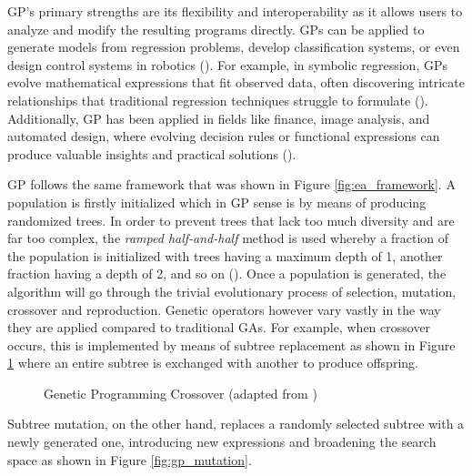 \noindent GP's primary strengths are its flexibility and interoperability as it allows users to analyze and modify the resulting programs directly. GPs can be applied to generate models from regression problems, develop classification systems, or even design control systems in robotics (\cite{o2009riccardo}). For example, in symbolic regression, GPs evolve mathematical expressions that fit observed data, often discovering intricate relationships that traditional regression techniques struggle to formulate (\cite{koza1994genetic}). Additionally, GP has been applied in fields like finance, image analysis, and automated design, where evolving decision rules or functional expressions can produce valuable insights and practical solutions (\cite{o2009riccardo}). \bigskip

\noindent GP follows the same framework that was shown in Figure \ref{fig:ea_framework}. A population is firstly initialized which in GP sense is by means of producing randomized trees. In order to prevent trees that lack too much diversity and are far too complex, the \textit{ramped half-and-half} method is used whereby a fraction of the population is initialized with trees having a maximum depth of 1, another fraction having a depth of 2, and so on (\cite{back2012handbook}). Once a population is generated, the algorithm will go through the trivial evolutionary process of selection, mutation, crossover and reproduction. Genetic operators however vary vastly in the way they are applied compared to traditional GAs. For example, when crossover occurs, this is implemented by means of subtree replacement as shown in Figure \ref{fig:gp_crossover} where an entire subtree is exchanged with another to produce offspring. \bigskip

\begin{figure}[H] %
	\centering %
	\caption{Genetic Programming Crossover (adapted from \cite{book_introduction_to_evolutionary_computing})}
	\label{fig:gp_crossover} %
\end{figure}

\noindent Subtree mutation, on the other hand, replaces a randomly selected subtree with a newly generated one, introducing new expressions and broadening the search space as shown in Figure \ref{fig:gp_mutation}. \bigskip

